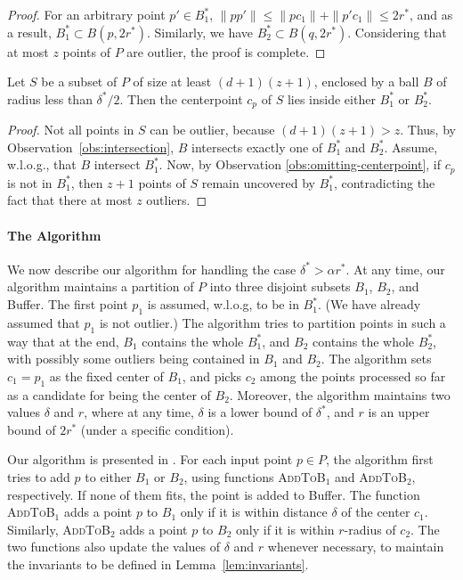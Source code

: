 \documentclass[envcountsame]{cls/cccg15}
\newcommand{\rc}{r}
\newcommand{\dz}{(d + 1)(z + 1)}
\newcommand{\textproc}{\textsc}
\newcommand{\len}[1]{\|{#1}\|}
\newcommand{\lee}{\leqslant}
\renewcommand{\leq}{\lee}
\begin{document}
\begin{proof}
	For an arbitrary point $p' \in B_1^*$, $\len{pp'} \leq \len{pc_1} + \len{p'c_1} \leq 2r^*$,
	and as a result, $B_1^* \subset B(p, 2r^*)$.
	Similarly, we have $B_2^* \subset B(q, 2r^*)$. 
	Considering that at most $z$ points of $P$ are outlier, the proof is complete.
\end{proof}

\begin{lemma}
\label{lem:center-point}
	Let $S$ be a subset of $P$ of size at least $\dz$,
	enclosed by a ball $B$ of radius less than $\delta^* / 2$.
	Then the centerpoint $c_p$ of $S$ lies inside either $B_1^{*}$ or $B_2^{*}$.
\end{lemma}

\begin{proof}
	Not all points in $S$ can be outlier, because $\dz > z$.
	Thus, by Observation~\ref{obs:intersection},
	$B$ intersects exactly one of $B_1^*$ and $B_2^*$.
	Assume, w.l.o.g., that $B$ intersect $B_1^*$. 
	Now, by Observation \ref{obs:omitting-centerpoint}, 
	if $c_p$ is not in $B_1^*$, 
	then $z+1$ points of $S$ remain uncovered by $B_1^*$,
	contradicting the fact that there at most $z$ outliers.	
\end{proof}

\paragraph{The Algorithm}
We now describe our algorithm for handling the case  $\delta^* > \alpha r^*$.
At any time, our algorithm maintains a partition of $P$ into three disjoint subsets
$B_1$, $B_2$, and Buffer.
The first point $p_1$ is assumed, w.l.o.g, to be in $B_1^*$. 
(We have already assumed that $p_1$ is not outlier.)
The algorithm tries to partition points in such a way that 
at the end,
$B_1$ contains the whole $B_1^*$, and $B_2$ contains the whole $B_2^*$,
with possibly some outliers being contained in $B_1$ and $B_2$.
The algorithm sets $c_1 = p_1$ as the fixed center of $B_1$,
and picks $c_2$ among the points processed so far as a candidate 
for being the center of $B_2$.
Moreover, the algorithm maintains two values $\delta$ and $r$,
where at any time, $\delta$ is a lower bound of $\delta^*$, 
and $r$ is an upper bound of $2r^*$ (under a specific condition). %

Our algorithm is presented in .
For each input point $p \in P$, the algorithm first tries 
to add $p$ to either $B_1$ or $B_2$,
using functions \textproc{AddToB$_1$} and \textproc{AddToB$_2$}, respectively.
If none of them fits, the point is added to Buffer.
The function \textproc{AddToB$_1$} adds a point $p$ to $B_1$
only if it is within distance $\delta$ of the center $c_1$.
Similarly, \textproc{AddToB$_2$} adds a point $p$ to $B_2$
only if it is within $\rc$-radius of $c_2$. 
The two functions also update the values of $\delta$ and $\rc$ whenever necessary,
to maintain the invariants to be defined in Lemma~\ref{lem:invariants}.
\end{document}
